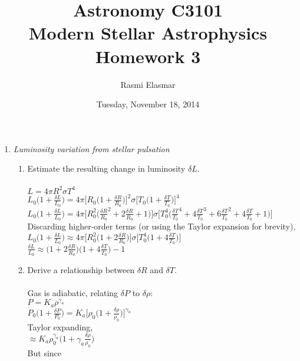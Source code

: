 \documentclass[]{article}
\begin{document}
\title{Astronomy C3101 \\ Modern Stellar Astrophysics \\ Homework 3}
\author{Rasmi Elasmar}
\date{Tuesday, November 18, 2014}
\maketitle

\begin{enumerate}
\item{
	\textit{Luminosity variation from stellar pulsation}
	\begin{enumerate}
	\item{
		Estimate the resulting change in luminosity $\delta L$.
		\\\\
		$L = 4\pi R^2\sigma T^4$
		\\
		$L_0 \big(1 + \frac{\delta L}{L_0}\big) = 4\pi \big[R_0 \big(1 + \frac{\delta R}{R_0}\big)\big]^2 \sigma \big[T_0\big(1 + \frac{\delta T}{T_0}\big)\big]^4$
		\\
		$L_0 \big(1 + \frac{\delta L}{L_0}\big)= 4\pi \big[R_0^2\big(\frac{\delta R}{R_0}^2+2\frac{\delta R}{R_0}+1\big)\big] \sigma \big[T_0^4\big(\frac{\delta T}{T_0}^4+4 \frac{\delta T}{T_0}^3+6 \frac{\delta T}{T_0}^2+4 \frac{\delta T}{T_0}+1\big)\big]$
		\\
		Discarding higher-order terms (or using the Taylor expansion for brevity),
		\\
		$L_0 \big(1 + \frac{\delta L}{L_0}\big) \approx 4\pi \big[R_0^2\big(1+2\frac{\delta R}{R_0}\big)\big] \sigma \big[T_0^4\big(1+4 \frac{\delta T}{T_0}\big)\big]$
		\\
		$\frac{\delta L}{L_0} \approx  \big(1+2\frac{\delta R}{R_0}\big)\big(1+4 \frac{\delta T}{T_0}\big) - 1$
	}
	\item{
		Derive a relationship between $\delta R$ and $\delta T$. 
		\\\\
		Gas is adiabatic, relating $\delta P$ to $\delta\rho$:
		\\
		$P = K_a \rho^{\gamma_a}$
		\\
		$P_0 \big(1 + \frac{\delta P}{P_0}\big) = K_a \big[\rho_0\big(1+ \frac{\delta\rho}{\rho_0}\big)\big]^{\gamma_a}$
		\\
		Taylor expanding,
		\\
		$\approx K_a \rho_0^{\gamma_a}\big(1+ \gamma_a\frac{\delta\rho}{\rho_0}\big)$
		\\
		But since 
		\\
}
\end{enumerate}}
\end{enumerate}
\end{document}
